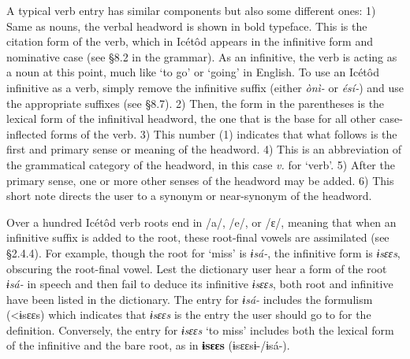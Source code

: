 
A typical verb entry has similar components but also some different ones: 1) Same as nouns, the verbal headword is shown in bold typeface. This is the citation form of the verb, which in Icétôd appears in the infinitive form and nominative case (see §8.2 in the grammar). As an infinitive, the verb is acting as a noun at this point, much like ‘to go’ or ‘going’ in English. To use an Icétôd infinitive as a verb, simply remove the infinitive suffix (either \textit{ònì- }or \textit{ésí-}) and use the appropriate suffixes (see §8.7). 2) Then, the form in the parentheses is the lexical form of the infinitival headword, the one that is the base for all other case-inflected forms of the verb. 3) This number (1) indicates that what follows is the first and primary sense or meaning of the headword. 4) This is an abbreviation of the grammatical category of the headword, in this case \textit{v. }for ‘verb’. 5) After the primary sense, one or more other senses of the headword may be added. 6) This short note directs the user to a synonym or near-synonym of the headword.


Over a hundred Icétôd verb roots end in /a/, /e/, or /ɛ/, meaning that when an infinitive suffix is added to the root, these root-final vowels are assimilated (see §2.4.4). For example, though the root for ‘miss’ is \textit{ɨsá-}, the infinitive form is \textit{ɨsɛɛs}, obscuring the root-final vowel. Lest the dictionary user hear a form of the root \textit{ɨsá-} in speech and then fail to deduce its infinitive \textit{ɨsɛɛs}, both root and infinitive have been listed in the dictionary. The entry for \textit{ɨsá-} includes the formulism (<ɨsɛɛs) which indicates that \textit{ɨsɛɛs }is the entry the user should go to for the definition. Conversely, the entry for \textit{ɨsɛɛs} ‘to miss’ includes both the lexical form of the infinitive and the bare root, as in \textbf{ɨsɛɛs}\textit{ }(ɨsɛɛsɨ-/ɨsá-). 
 
